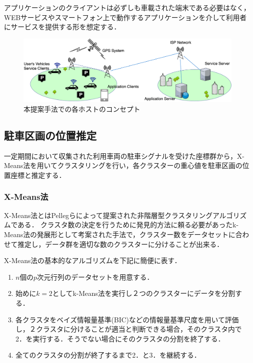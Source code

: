 アプリケーションのクライアントは必ずしも車載された端末である必要はなく，WEBサービスやスマートフォン上で動作するアプリケーションを介して利用者にサービスを提供する形を想定する．


\begin{figure}
	\centering
	\includegraphics[width=15cm]{fig/network-concept.png}
	\caption{本提案手法での各ホストのコンセプト}
	\label{network-concept}
\end{figure}


\subsection{駐車区画の位置推定}
\label{how-to-park-area}
一定期間において収集された利用車両の駐車シグナルを受けた座標群から，X-Means法を用いてクラスタリングを行い，各クラスターの重心値を駐車区画の位置座標と推定する．

\subsubsection{X-Means法}
X-Means法とはPellegらによって提案された非階層型クラスタリングアルゴリズムである\cite{Pelleg}．
クラスタ数の決定を行うために発見的方法に頼る必要があったk-Means法の発展形として考案された手法で，クラスター数をデータセットに合わせて推定し，データ群を適切な数のクラスターに分けることが出来る．


X-Means法の基本的なアルゴリズムを下記に簡便に表す．
\begin{enumerate}
	\item $n$個の$p$次元行列のデータセットを用意する．
	\item 始めに$k=2$としてk-Means法を実行し２つのクラスターにデータを分割する．
	\item 各クラスタをベイズ情報量基準(BIC)などの情報量基準尺度を用いて評価し，２クラスタに分けることが適当と判断できる場合，そのクラスタ内で2．を実行する．そうでない場合にそのクラスタの分割を終了する．
	\item 全てのクラスタの分割が終了するまで2．と3．を継続する．
\end{enumerate}

